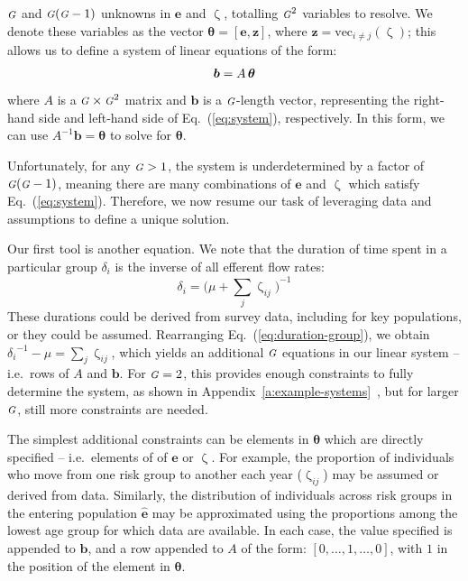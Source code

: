 \documentclass[10pt]{article}
\numberwithin{equation}{section}
\renewcommand{\zeta}{\upzeta}
\newcommand{\G}{{\mbox{\footnotesize{\textit{G}}}}}
\newcommand{\eq}[1]{Eq.~(\ref{#1})}
\newcommand{\app}[1]{Appendix~\ref{#1}~\nameref{#1}}
\begin{document}
$\G$ and $\G(\G-1)$ unknowns in $\bm{e}$ and $\zeta$, totalling $\G^2$ variables to resolve.
We denote these variables as the vector $\bm{\theta} = \left[\bm{e}, \bm{z}\right]$,
where $\bm{z} = \mathrm{vec}_{i \ne j}(\zeta)$;
this allows us to define
a system of linear equations of the form:
\begin{equation}
\bm{b} = A \thinspace \bm{\theta}
\end{equation}
where $A$ is a $\G \times \G^2 $ matrix
and $\bm{b}$ is a $\G$-length vector,
representing the right-hand side and left-hand side of \eq{eq:system}, respectively.
In this form, we can use $A^{-1}\bm{b} = \bm{\theta}$ to solve for $\bm{\theta}$.
\par
Unfortunately, for any $\G > 1$, the system is underdetermined by a factor of $\G(\G-1)$,
meaning there are many combinations of $\bm{e}$ and $\zeta$ which satisfy \eq{eq:system}.
Therefore, we now resume our task of leveraging data and assumptions
to define a unique solution.
\par
Our first tool is another equation.
We note that the duration of time spent in a particular group $\delta_i$
is the inverse of all efferent flow rates:
\begin{equation}\label{eq:duration-group}
\delta_i = {\bigg(\mu + \sum_{j}{\zeta_{ij}}\bigg)}^{-1}
\end{equation}
These durations could be derived from survey data, including for key populations,
or they could be assumed.
Rearranging \eq{eq:duration-group}, we obtain
${\delta_i}^{-1} - \mu = \sum_{j}{\zeta_{ij}}$,
which yields an additional $\G$ equations in our linear system -- i.e.\ rows of $A$ and $\bm{b}$.
For $\G = 2$, this provides enough constraints to fully determine the system,
as shown in \app{a:example-systems},
but for larger $\G$, still more constraints are needed.
\par
The simplest additional constraints can be elements in $\bm{\theta}$ which are directly specified
-- i.e.\ elements of of $\bm{e}$ or $\zeta$.
For example, the proportion of individuals who
move from one risk group to another each year ($\zeta_{ij}$)
may be assumed or derived from data.
Similarly, the distribution of individuals
across risk groups in the entering population $\bm{\hat{e}}$
may be approximated using the proportions among
the lowest age group for which data are available.
In each case, the value specified is appended to $\bm{b}$,
and a row appended to $A$ of the form: $[0,\dots,1,\dots,0]$,
with $1$ in the position of the element in $\bm{\theta}$.
\par
\end{document}
